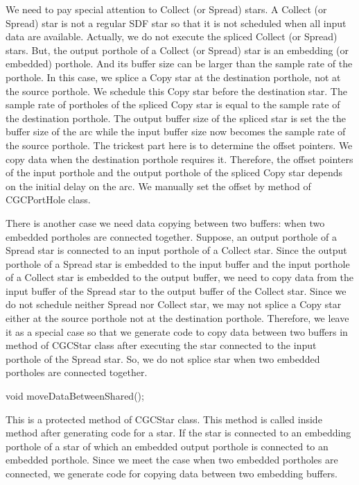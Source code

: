 {We need to pay special attention to Collect (or Spread) stars. A Collect
(or Spread) star is not a regular SDF star so that it is not 
scheduled when all input data are available. Actually, we do not execute 
the spliced Collect (or Spread) stars.
But, the output porthole of a Collect (or Spread) star is an embedding
(or embedded) porthole. And
its buffer size can be larger than the sample rate of the porthole.
In this case, we splice a Copy star at the destination porthole, not
at the source porthole. We schedule this Copy star before the destination
star. The sample rate of portholes of the spliced Copy star is equal to
the sample rate of the destination porthole. The output buffer size
of the spliced star is set the the buffer size of the arc while the input
buffer size now becomes the sample rate of the source porthole. The
trickest part here is to determine the offset pointers. We copy data 
when the destination porthole requires it. Therefore, the offset pointers of
the input porthole and the output porthole of the spliced Copy star
depends on the initial delay on the arc. We manually set the offset by
 method of CGCPortHole class.

There is another case we need data copying between two buffers: when
two embedded portholes are connected together. Suppose, an output porthole
of a Spread star is connected to an input porthole of a Collect star.
Since the output porthole of a Spread star is embedded to the input buffer
and the input porthole of a Collect star is embedded to the output buffer,
we need to copy data from the input buffer of the Spread star to the output
buffer of the Collect star. Since we do not schedule neither Spread nor
Collect star, we may not splice a Copy star either at the source porthole
not at the destination porthole. Therefore, we leave it as a special case
so that we generate code to copy data between two buffers in
 method of CGCStar class after executing the
star connected to the input porthole of the Spread star. So, we do not
splice star when two embedded portholes are connected together.

\begin{example}
void moveDataBetweenShared();
\end{example}

This is a protected method of CGCStar class. This method is called inside
 method after generating code for a star. If the star is
connected to an embedding porthole of a star of which an embedded output 
porthole is connected to an embedded porthole. Since we meet the case
when two embedded portholes are connected, we generate code for copying
data between two embedding buffers.

}
